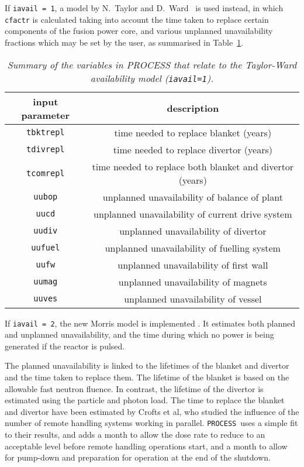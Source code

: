 \documentclass[11pt,a4paper]{report}
\newcommand{\process}{\mbox{\texttt{PROCESS}}}
\begin{document}
If \texttt{iavail = 1}, a model by N.~Taylor and D.~Ward~\cite{TaylorWard_avail1999} is used instead, in which \texttt{cfactr} is calculated taking into account the time taken to replace certain components of the fusion power core, and various unplanned unavailability fractions which may be set by the user, as summarised in Table~\ref{tab:availability}.
\begin{table}[tbph]
\begin{center}
\begin{tabular}{||c|c||} \hline
input parameter & description \\ \hline
\texttt{tbktrepl}  & time needed to replace blanket (years) \\
\texttt{tdivrepl} & time needed to replace divertor (years) \\
\texttt{tcomrepl} & time needed to replace both blanket and divertor (years) \\
\texttt{uubop} & unplanned unavailability of balance of plant \\
\texttt{uucd} & unplanned unavailability of current drive system \\
\texttt{uudiv} & unplanned unavailability of divertor \\
\texttt{uufuel} & unplanned unavailability of fuelling system \\
\texttt{uufw} & unplanned unavailability of first wall \\
\texttt{uumag} & unplanned unavailability of magnets \\
\texttt{uuves} & unplanned unavailability of vessel \\
\hline
\end{tabular}
\end{center}
\caption[Parameters used in the Taylor-Ward availability model]
{\label{tab:availability}
  \textit{Summary of the variables in PROCESS that relate to
    the Taylor-Ward availability model (\texttt{iavail=1}).}
}
\end{table}

If \texttt{iavail = 2}, the new Morris model is implemented \cite{kovari_eng}. It estimates both planned and unplanned unavailability, and the time during which no power is being generated if the reactor is pulsed. 

The planned unavailability is linked to the lifetimes of the blanket and divertor and the time taken to replace them.  The lifetime of the blanket is based on the allowable fast neutron fluence.  In contrast, the lifetime of the divertor is estimated using the particle and photon load. The time to replace the blanket and divertor have been estimated by Crofts et al, who studied the influence of the number of remote handling systems working in parallel.  \process\ uses a simple fit to their results, and adds a month to allow the dose rate to reduce to an acceptable level before remote handling operations start, and a month to allow for pump-down and preparation for operation at the end of the shutdown.   
\end{document}
